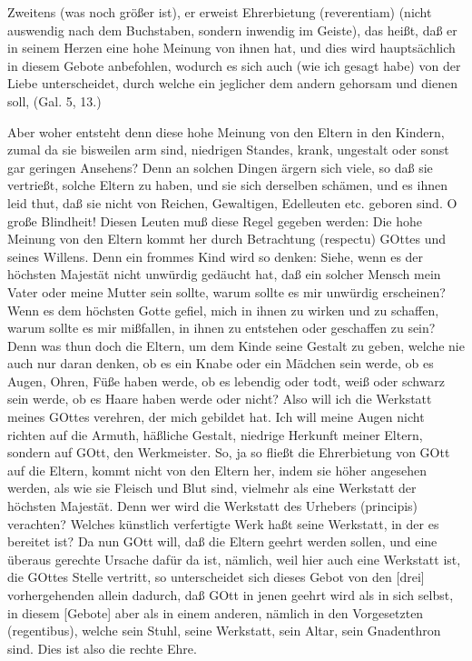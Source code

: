 Zweitens (was noch größer ist), er erweist Ehrerbietung (reverentiam) (nicht auswendig nach dem Buchstaben, sondern inwendig im Geiste), das heißt, daß er in seinem Herzen eine hohe Meinung von ihnen hat, und dies wird hauptsächlich in diesem Gebote anbefohlen, wodurch es sich auch (wie ich gesagt habe) von der Liebe unterscheidet, durch welche ein jeglicher dem andern gehorsam und dienen soll, (Gal. 5, 13.)

Aber woher entsteht denn diese hohe Meinung von den Eltern in den Kindern, zumal da sie bisweilen arm sind, niedrigen Standes, krank, ungestalt oder sonst gar geringen Ansehens? Denn an solchen Dingen ärgern sich viele, so
daß sie vertrießt, solche Eltern zu haben, und sie sich derselben schämen, und es ihnen leid thut, daß sie nicht von Reichen, Gewaltigen, Edelleuten etc. geboren sind. O große Blindheit! Diesen Leuten muß diese Regel gegeben werden: Die hohe Meinung von den Eltern kommt her durch Betrachtung (respectu) GOttes und seines Willens. Denn ein frommes Kind wird so denken: Siehe, wenn es der höchsten Majestät nicht unwürdig gedäucht hat, daß ein solcher Mensch mein Vater oder meine Mutter sein sollte, warum sollte es mir unwürdig erscheinen? Wenn es dem höchsten Gotte gefiel, mich in ihnen zu wirken und zu schaffen, warum sollte es mir mißfallen, in ihnen zu entstehen oder geschaffen zu sein? Denn was thun doch die Eltern, um dem Kinde seine Gestalt zu geben, welche nie auch nur daran denken, ob es ein Knabe oder ein Mädchen sein werde, ob es Augen, Ohren, Füße haben werde, ob es lebendig oder todt, weiß oder schwarz sein werde, ob es Haare haben werde oder nicht? Also will ich die Werkstatt meines GOttes verehren, der mich gebildet hat. Ich will meine Augen nicht richten auf die Armuth, häßliche Gestalt, niedrige Herkunft meiner Eltern, sondern auf GOtt, den Werkmeister. So, ja so fließt die Ehrerbietung von GOtt auf die Eltern, kommt nicht von den Eltern her, indem sie höher angesehen werden, als wie sie Fleisch und Blut sind, vielmehr als eine Werkstatt der höchsten Majestät. Denn wer wird die Werkstatt des Urhebers (principis) verachten? Welches künstlich verfertigte Werk haßt seine Werkstatt, in der es bereitet ist? Da nun GOtt will, daß die Eltern geehrt werden sollen, und eine überaus gerechte Ursache dafür da ist, nämlich, weil hier auch eine Werkstatt ist, die GOttes Stelle vertritt, so unterscheidet sich dieses Gebot von den [drei] vorhergehenden allein dadurch, daß GOtt in jenen geehrt wird als in sich selbst, in diesem [Gebote] aber als in einem anderen, nämlich in den Vorgesetzten (regentibus), welche sein Stuhl, seine Werkstatt, sein Altar, sein Gnadenthron sind. Dies ist also die rechte Ehre.

